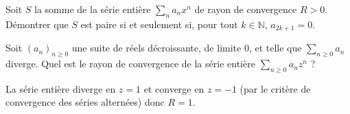 \documentclass{book}
\begin{document}
\begin{Exercice}
Soit $S$ la somme de la série entière $\sum_n a_n x^n$ de rayon de convergence $R>0$. Démontrer que $S$ est paire si et seulement si, pour tout $k\in\mathbb N$, $a_{2k+1}=0$.
\end{Exercice}
\begin{Exercice}
  Soit $(a_{n})_{n\geq 0} $ une suite de réels décroissante, de limite 0, et telle que $ \sum _{n\geq 0}a_{n}$ diverge. Quel est le rayon de convergence de la série entière $\sum _{n\geq 0}a_{n}z^{n}$ ?
\begin{Correction}
La série entière diverge en $z=1$ et converge en $z=-1$  (par le critère de convergence des séries alternées) donc $ R=1$.
\end{Correction}
\end{Exercice}
\end{document}
